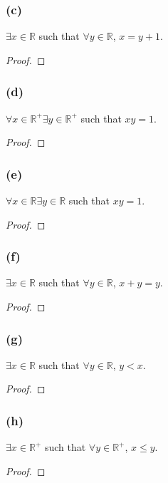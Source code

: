 \documentclass[14pt]{extarticle}
\newcommand{\R}{\mathbb{R}}
\newcommand{\fa}{\forall}
\newcommand{\te}{\exists}
\begin{document}
\subsubsection{(c)}
$\te x \in \R$ such that $\fa y \in \R$, $x = y + 1$.

\begin{proof}

\end{proof}

\subsubsection{(d)}
$\fa x \in \R^+ \te y \in \R^+$ such that $xy = 1$.

\begin{proof}

\end{proof}

\subsubsection{(e)}
$\fa x \in \R \te y \in \R$ such that $xy = 1$.

\begin{proof}

\end{proof}

\subsubsection{(f)}
$\te x \in \R$ such that $\fa y \in \R$, $x + y = y$.

\begin{proof}

\end{proof}

\subsubsection{(g)}
$\te x \in \R$ such that $\fa y \in \R$, $y < x$.

\begin{proof}

\end{proof}

\subsubsection{(h)}
$\te x \in \R^+$ such that $\fa y \in \R^+$, $x \leq y$.

\begin{proof}

\end{proof}
\end{document}
